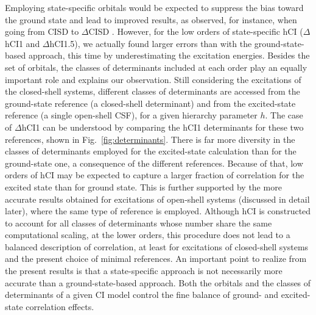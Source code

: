 \documentclass[aip,jcp,reprint,noshowkeys,superscriptaddress]{revtex4-1}
\begin{document}
Employing state-specific orbitals would be expected to suppress the bias toward the ground state and lead to improved results, as observed, for instance, when going from CISD to $\Delta$CISD \cite{Kossoski_2023}.
However, for the low orders of state-specific hCI ($\Delta$hCI1 and $\Delta$hCI1.5), we actually found larger errors than with the ground-state-based approach, this time by underestimating the excitation energies.
Besides the set of orbitals, the classes of determinants included at each order play an equally important role and explains our observation.
Still considering the excitations of the closed-shell systems,
different classes of determinants are accessed from the ground-state reference (a closed-shell determinant) and from the excited-state reference (a single open-shell CSF),
for a given hierarchy parameter $h$.
The case of $\Delta$hCI1 can be understood by comparing the hCI1 determinants for these two references, shown in Fig.~\ref{fig:determinants}.
There is far more diversity in the classes of determinants employed for the excited-state calculation than for the ground-state one, a consequence of the different references.
Because of that, low orders of hCI may be expected to capture a larger fraction of correlation for the excited state than for ground state.
This is further supported by the more accurate results obtained for excitations of open-shell systems (discussed in detail later), where the same type of reference is employed.
Although hCI is constructed to account for all classes of determinants whose number share the same computational scaling,
at the lower orders, this procedure does not lead to a balanced description of correlation, at least for excitations of closed-shell systems and the present choice of minimal references.
An important point to realize from the present results is that a state-specific approach is not necessarily more accurate than a ground-state-based approach.
Both the orbitals and the classes of determinants of a given CI model control the fine balance of ground- and excited-state correlation effects.
\end{document}

